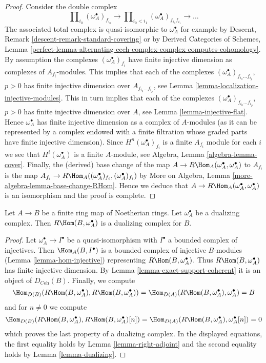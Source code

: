 \begin{proof}
Consider the double complex
$$
\prod\nolimits_{i_0} (\omega_A^\bullet)_{f_{i_0}}
\to
\prod\nolimits_{i_0 < i_1} (\omega_A^\bullet)_{f_{i_0}f_{i_1}}
\to \ldots
$$
The associated total complex is quasi-isomorphic to $\omega_A^\bullet$
for example by Descent, Remark \ref{descent-remark-standard-covering}
or by
Derived Categories of Schemes, Lemma
\ref{perfect-lemma-alternating-cech-complex-complex-computes-cohomology}.
By assumption the complexes $(\omega_A^\bullet)_{f_i}$ have
finite injective dimension as complexes of $A_{f_i}$-modules.
This implies that each of the complexes
$(\omega_A^\bullet)_{f_{i_0} \ldots f_{i_p}}$, $p > 0$ has
finite injective dimension over $A_{f_{i_0} \ldots f_{i_p}}$,
see Lemma \ref{lemma-localization-injective-modules}.
This in turn implies that each of the complexes
$(\omega_A^\bullet)_{f_{i_0} \ldots f_{i_p}}$, $p > 0$ has
finite injective dimension over $A$, see
Lemma \ref{lemma-injective-flat}. Hence $\omega_A^\bullet$
has finite injective dimension as a complex of $A$-modules
(as it can be represented by a complex endowed with
a finite filtration whose graded parts have finite injective
dimension). Since $H^n(\omega_A^\bullet)_{f_i}$ is a finite
$A_{f_i}$ module for each $i$ we see that $H^i(\omega_A^\bullet)$
is a finite $A$-module, see Algebra, Lemma \ref{algebra-lemma-cover}.
Finally, the (derived) base change of the map
$A \to R\Hom_A(\omega_A^\bullet, \omega_A^\bullet)$ to $A_{f_i}$
is the map
$A_{f_i} \to R\Hom_A((\omega_A^\bullet)_{f_i}, (\omega_A^\bullet)_{f_i})$ by
More on Algebra, Lemma \ref{more-algebra-lemma-base-change-RHom}.
Hence we deduce that
$A \to R\Hom_A(\omega_A^\bullet, \omega_A^\bullet)$
is an isomorphism and the proof is complete.
\end{proof}

\begin{lemma}
\label{lemma-dualizing-finite}
Let $A \to B$ be a finite ring map of Noetherian rings.
Let $\omega_A^\bullet$ be a dualizing complex.
Then $R\Hom(B, \omega_A^\bullet)$ is a dualizing complex for $B$.
\end{lemma}

\begin{proof}
Let $\omega_A^\bullet \to I^\bullet$ be a quasi-isomorphism
with $I^\bullet$ a bounded complex of injectives.
Then $\Hom_A(B, I^\bullet)$ is a bounded complex of injective
$B$-modules (Lemma \ref{lemma-hom-injective}) representing
$R\Hom(B, \omega_A^\bullet)$.
Thus $R\Hom(B, \omega_A^\bullet)$ has finite injective dimension.
By Lemma \ref{lemma-exact-support-coherent} it is an object of
$D_{\textit{Coh}}(B)$. Finally, we compute
$$
\Hom_{D(B)}(R\Hom(B, \omega_A^\bullet), R\Hom(B, \omega_A^\bullet)) =
\Hom_{D(A)}(R\Hom(B, \omega_A^\bullet), \omega_A^\bullet) = B
$$
and for $n \not = 0$ we compute
$$
\Hom_{D(B)}(R\Hom(B, \omega_A^\bullet), R\Hom(B, \omega_A^\bullet)[n]) =
\Hom_{D(A)}(R\Hom(B, \omega_A^\bullet), \omega_A^\bullet[n]) = 0
$$
which proves the last property of a dualizing complex.
In the displayed equations, the first
equality holds by Lemma \ref{lemma-right-adjoint}
and the second equality holds by Lemma \ref{lemma-dualizing}.
\end{proof}

